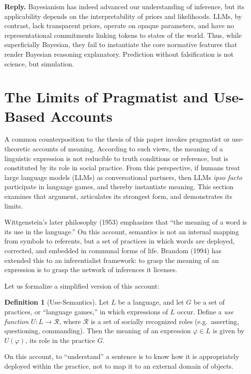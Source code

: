\documentclass[12pt]{article}
\theoremstyle{plain}
\theoremstyle{definition}
\newtheorem{definition}[theorem]{Definition}
\theoremstyle{remark}
\begin{document}
\textbf{Reply.} Bayesianism has indeed advanced our understanding of inference, 
but its applicability depends on the interpretability of priors and likelihoods. 
LLMs, by contrast, lack transparent priors, operate on opaque parameters, 
and have no representational commitments linking tokens to states of the world. 
Thus, while superficially Bayesian, they fail to instantiate the core normative 
features that render Bayesian reasoning explanatory. Prediction without 
falsification is not science, but simulation.

\section{The Limits of Pragmatist and Use-Based Accounts}

A common counterposition to the thesis of this paper invokes pragmatist 
or use-theoretic accounts of meaning. According to such views, 
the meaning of a linguistic expression is not reducible to truth conditions 
or reference, but is constituted by its role in social practice. 
From this perspective, if humans treat large language models (LLMs) 
as conversational partners, then LLMs \emph{ipso facto} participate in 
language games, and thereby instantiate meaning. 
This section examines that argument, articulates its strongest form, 
and demonstrates its limits. 

Wittgenstein’s later philosophy (1953) emphasizes that ``the meaning of a word 
is its use in the language.'' On this account, semantics is not an internal 
mapping from symbols to referents, but a set of practices in which words 
are deployed, corrected, and embedded in communal forms of life. 
Brandom (1994) has extended this to an inferentialist framework: 
to grasp the meaning of an expression is to grasp the network of 
inferences it licenses. 

Let us formalize a simplified version of this account:

\begin{definition}[Use-Semantics]
Let $L$ be a language, and let $G$ be a set of practices, or 
``language games,'' in which expressions of $L$ occur. 
Define a \emph{use function} $U: L \to \mathcal{R}$, where 
$\mathcal{R}$ is a set of socially recognized roles (e.g.\ asserting, questioning, 
commanding). Then the meaning of an expression $\varphi \in L$ 
is given by $U(\varphi)$, its role in the practice $G$. 
\end{definition}

On this account, to ``understand'' a sentence is to know how it is 
appropriately deployed within the practice, not to map it to 
an external domain of objects. 
\end{document}
